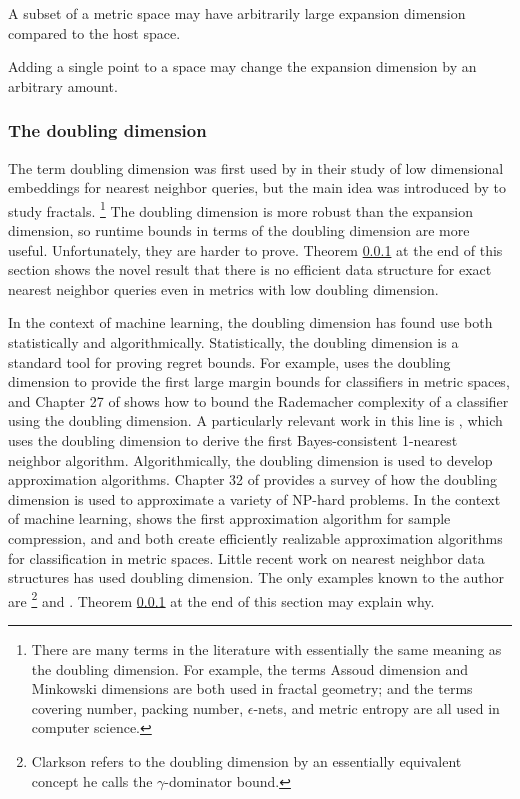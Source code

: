 \documentclass[../main.tex]{subfiles}
\begin{document}
\begin{example}
    A subset of a metric space may have arbitrarily large expansion dimension compared to the host space.
\end{example}

\begin{example}
    Adding a single point to a space may change the expansion dimension by an arbitrary amount.
\end{example}


\subsubsection{The doubling dimension}

The term doubling dimension was first used by \citet{gupta2003bounded} in their study of low dimensional embeddings for nearest neighbor queries,
but the main idea was introduced by \citet{assoud1979etude} to study fractals.%
\footnote{
    There are many terms in the literature with essentially the same meaning as the doubling dimension.
    For example, the terms Assoud dimension and Minkowski dimensions are both used in fractal geometry;
    and the terms covering number, packing number, $\epsilon$-nets, and metric entropy are all used in computer science. 
}
The doubling dimension is more robust than the expansion dimension,
so runtime bounds in terms of the doubling dimension are more useful. 
Unfortunately, they are harder to prove.
Theorem \ref{} at the end of this section shows the novel result that there is no efficient data structure for exact nearest neighbor queries even in metrics with low doubling dimension.

In the context of machine learning, the doubling dimension has found use both statistically and algorithmically.
Statistically, the doubling dimension is a standard tool for proving regret bounds.
For example, \citet{luxburg2004distance} uses the doubling dimension to provide the first large margin bounds for classifiers in metric spaces,
and Chapter 27 of \cite{shalev2014understanding} shows how to bound the Rademacher complexity of a classifier using the doubling dimension.
A particularly relevant work in this line is \citet{kontorovich2015bayes},
which uses the doubling dimension to derive the first Bayes-consistent 1-nearest neighbor algorithm.
Algorithmically, the doubling dimension is used to develop approximation algorithms.
Chapter 32 of \cite{toth2017handbook} provides a survey of how the doubling dimension is used to approximate a variety of NP-hard problems.
In the context of machine learning, \citet{gottlieb2014near} shows the first approximation algorithm for sample compression,
and
\citet{gottlieb2014efficient} and \citet{gottlieb2017efficient} both create efficiently realizable approximation algorithms for classification in metric spaces.
Little recent work on nearest neighbor data structures has used doubling dimension.
The only examples known to the author are \citet{clarkson1997nearest}\footnote{Clarkson refers to the doubling dimension by an essentially equivalent concept he calls the $\gamma$-dominator bound.} and \citet{krauthgamer2004navigating}.
Theorem \ref{} at the end of this section may explain why.
\end{document}
